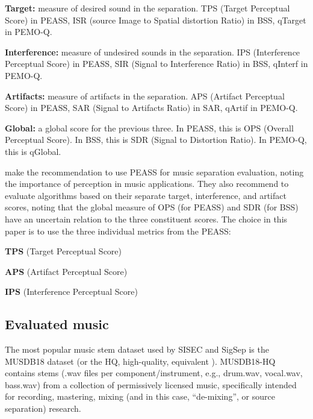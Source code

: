 \documentclass[letter,12pt]{article}
\newenvironment{tight_enumerate}{
\begin{enumerate}
  \setlength{\itemsep}{0pt}
  \setlength{\parskip}{0pt}
}{\end{enumerate}}
\newenvironment{tight_itemize}{
\begin{itemize}
  \setlength{\itemsep}{0pt}
  \setlength{\parskip}{0pt}
}{\end{itemize}}
\begin{document}
\begin{tight_itemize}
\item
	\textbf{Target:} measure of desired sound in the separation. TPS (Target Perceptual Score) in PEASS, ISR (source Image to Spatial distortion Ratio) in BSS, qTarget in PEMO-Q.
\item
	\textbf{Interference:} measure of undesired sounds in the separation. IPS (Interference Perceptual Score) in PEASS, SIR (Signal to Interference Ratio) in BSS, qInterf in PEMO-Q.
\item
	\textbf{Artifacts:} measure of artifacts in the separation. APS (Artifact Perceptual Score) in PEASS, SAR (Signal to Artifacts Ratio) in SAR, qArtif in PEMO-Q.
\item
	\textbf{Global:} a global score for the previous three. In PEASS, this is OPS (Overall Perceptual Score). In BSS, this is SDR (Signal to Distortion Ratio). In PEMO-Q, this is qGlobal.
\end{tight_itemize}

\citet{beassvpeass} make the recommendation to use PEASS for music separation evaluation, noting the importance of perception in music applications. They also recommend to evaluate algorithms based on their separate target, interference, and artifact scores, noting that the global measure of OPS (for PEASS) and SDR (for BSS) have an uncertain relation to the three constituent scores. The choice in this paper is to use the three individual metrics from the PEASS:
\begin{tight_enumerate}
	\item
		\textbf{TPS} (Target Perceptual Score)
	\item
		\textbf{APS} (Artifact Perceptual Score)
	\item
		\textbf{IPS} (Interference Perceptual Score)
\end{tight_enumerate}

\subsection{Evaluated music}

The most popular music stem dataset used by SISEC and SigSep is the MUSDB18 dataset \cite{musdb18} (or the HQ, high-quality, equivalent \cite{musdb18-hq}). MUSDB18-HQ contains stems (.wav files per component/instrument, e.g., drum.wav, vocal.wav, bass.wav) from a collection of permissively licensed music, specifically intended for recording, mastering, mixing (and in this case, ``de-mixing'', or source separation) research. 
\end{document}
